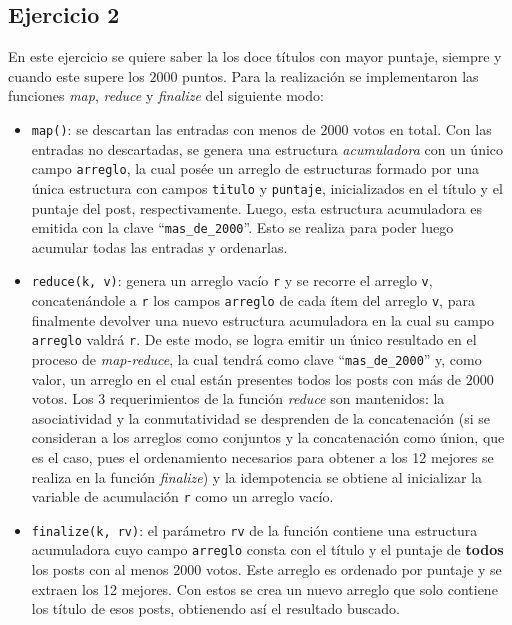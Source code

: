 \documentclass[a4paper]{article}
\begin{document}
\subsection{Ejercicio 2}
En este ejercicio se quiere saber la los doce títulos con mayor puntaje,
siempre y cuando este supere los $2000$ puntos. Para la realización se
implementaron las funciones \textit{map}, \textit{reduce} y \textit{finalize}
del siguiente modo:
\begin{itemize}
  \item \verb|map()|: se descartan las entradas con menos de $2000$ votos en
  total. Con las entradas no descartadas, se genera una estructura
  \textit{acumuladora} con un único campo \verb|arreglo|, la cual posée un
  arreglo de estructuras formado por una única estructura con campos
  \verb|titulo| y \verb|puntaje|, inicializados en el título y el puntaje del
  post, respectivamente. Luego, esta estructura acumuladora es emitida con la
  clave ``\verb|mas_de_2000|''. Esto se realiza para poder luego acumular todas
  las entradas y ordenarlas.
  \item \verb|reduce(k, v)|: genera un arreglo vacío \verb|r| y se recorre el
  arreglo \verb|v|, concatenándole a \verb|r| los campos \verb|arreglo| de cada
  ítem del arreglo \verb|v|, para finalmente devolver una nuevo estructura
  acumuladora en la cual su campo \verb|arreglo| valdrá \verb|r|. De este modo,
  se logra emitir un único resultado en el proceso de \textit{map-reduce}, la
  cual tendrá como clave ``\verb|mas_de_2000|'' y, como valor, un arreglo en el
  cual están presentes todos los posts con más de $2000$ votos. Los 3
  requerimientos de la función \textit{reduce} son mantenidos: la asociatividad
  y la conmutatividad se desprenden de la concatenación (si se consideran a los
  arreglos como conjuntos y la concatenación como únion, que es el caso, pues
  el ordenamiento necesarios para obtener a los 12 mejores se realiza en la
  función \textit{finalize}) y la idempotencia se obtiene al inicializar la
  variable de acumulación \verb|r| como un arreglo vacío.
  \item \verb|finalize(k, rv)|: el parámetro \verb|rv| de la función contiene
  una estructura acumuladora cuyo campo \verb|arreglo| consta con el título y
  el puntaje de \textbf{todos} los posts con al menos $2000$ votos. Este
  arreglo es ordenado por puntaje y se extraen los 12 mejores. Con estos se
  crea un nuevo arreglo que solo contiene los título de esos posts, obtienendo
  así el resultado buscado.
\end{itemize}
\end{document}
